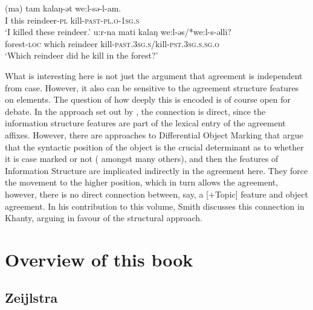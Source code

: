 \documentclass[output=paper
,modfonts
,nonflat]{langsci/langscibook}
\begin{document}
\begin{exe}
	\ex
	\begin{xlist}
		\ex
		\gll (ma) tam kalaŋ-ət we:l-sə-l-am.\\
		I this reindeer-\textsc{pl} kill-\textsc{past-pl.o-1sg.s}\\
		\glt ‘I killed these reindeer.’
		\ex
		\gll u:r-na mati kalaŋ we:l-əs/*we:l-s-əlli?\\
		forest-\textsc{loc} which reindeer kill-\textsc{past.3sg.s}/kill-\textsc{pst.3sg.s.sg.o}\\
		\glt `Which reindeer did he kill in the forest?'
	\end{xlist}
\end{exe}
What is interesting here is not just the argument that agreement is independent from case.
However, it also can be sensitive to the agreement structure features on elements.
The question of how deeply this is encoded is of course open for debate.
In the approach set out by \citet{dn2011}, the connection is direct, since the information structure features are part of the lexical entry of the agreement affixes.
However, there are approaches to Differential Object Marking that argue that the syntactic position of the object is the crucial determinant as to whether it is case marked or not (\citealp{woolford1999,woolford2001,Baker2015} amongst many others), and then the features of Information Structure are implicated indirectly in the agreement here.
They force the movement to the higher position, which in turn allows the agreement, however, there is no direct connection between, say, a [$+$Topic] feature and object agreement.
In his contribution to this volume, Smith discusses this connection in Khanty, arguing in favour of the structural approach.

\section{Overview of this book}
\label{secchapteroverviews}

\subsection{Zeijlstra}
\label{sec:zeiljstra}
\end{document}
